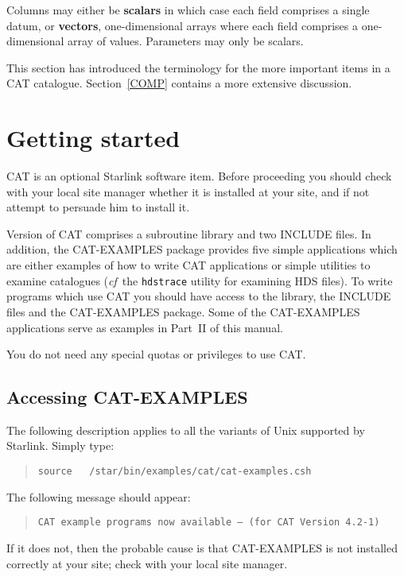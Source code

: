 Columns may either be {\bf scalars} in which case each field comprises
a single datum, or {\bf vectors}, one-dimensional arrays where each
field comprises a one-dimensional array of values. Parameters may only
be scalars.

This section has introduced the terminology for the more important
items in a CAT catalogue. Section~\ref{COMP} contains a more extensive
discussion.


\section{\label{START}Getting started}

CAT is an optional Starlink software item. Before proceeding you should 
check with your local site manager whether it is installed at your site,
and if not attempt to persuade him to install it.

Version \CATversion of CAT comprises a subroutine library and two INCLUDE
files.  In addition, the CAT-EXAMPLES package provides five simple
applications which are either examples of how to write CAT applications
or simple utilities to examine catalogues ({\it cf}\, the {\tt hdstrace}
utility for examining HDS files). To write programs which use CAT you
should have access to the library, the INCLUDE files and the CAT-EXAMPLES
package.  Some of the CAT-EXAMPLES applications serve as examples in
Part~II of this manual.

You do not need any special quotas or privileges to use CAT.


\subsection{\label{ACCESS}Accessing CAT-EXAMPLES}

The following description applies to all the variants of Unix supported
by Starlink.  Simply type:

\begin{verse}
{\tt source ~ /star/bin/examples/cat/cat-examples.csh}
\end{verse}

The following message should appear:

\begin{verse}
{\tt CAT example programs now available -- (for CAT Version 4.2-1)} \\
\end{verse}

If it does not, then the probable cause is that CAT-EXAMPLES is not
installed correctly at your site; check with your local site manager.

